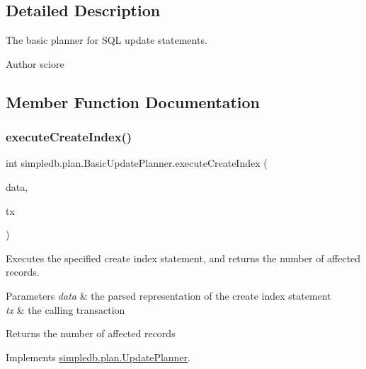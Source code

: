 \subsection{Detailed Description}
The basic planner for S\+QL update statements. \begin{DoxyAuthor}{Author}
sciore 
\end{DoxyAuthor}


\subsection{Member Function Documentation}
\mbox{\label{classsimpledb_1_1plan_1_1BasicUpdatePlanner_a662b9a96ae0b34c6820cf7e1c25a0577}} 
\subsubsection{\texorpdfstring{execute\+Create\+Index()}{executeCreateIndex()}}
{\footnotesize\ttfamily int simpledb.\+plan.\+Basic\+Update\+Planner.\+execute\+Create\+Index (\begin{DoxyParamCaption}\item[{\hyperlink{classsimpledb_1_1parse_1_1CreateIndexData}{Create\+Index\+Data}}]{data,  }\item[{\hyperlink{classsimpledb_1_1tx_1_1Transaction}{Transaction}}]{tx }\end{DoxyParamCaption})\hspace{0.3cm}{\ttfamily [inline]}}

Executes the specified create index statement, and returns the number of affected records. 
\begin{DoxyParams}{Parameters}
{\em data} & the parsed representation of the create index statement \\
\hline
{\em tx} & the calling transaction \\
\hline
\end{DoxyParams}
\begin{DoxyReturn}{Returns}
the number of affected records 
\end{DoxyReturn}


Implements \hyperlink{interfacesimpledb_1_1plan_1_1UpdatePlanner_a62e66672add275bc79b05825186051aa}{simpledb.\+plan.\+Update\+Planner}.

